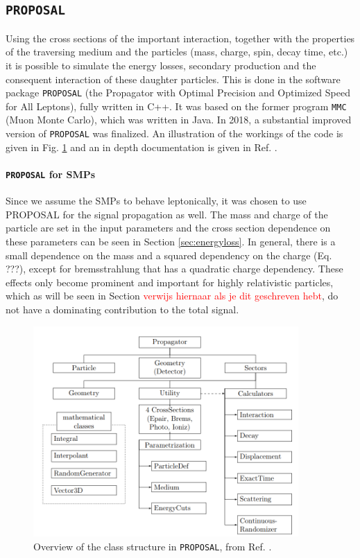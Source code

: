 \subsection{\texttt{PROPOSAL}}
Using the cross sections of the important interaction, together with the properties of the traversing medium and the particles (mass, charge, spin, decay time, etc.) it is possible to simulate the energy losses, secondary production and the consequent interaction of these daughter particles. This is done in the software package \texttt{PROPOSAL}  (the Propagator with Optimal Precision and Optimized Speed for All Leptons), fully written in C++. It was based on the former program \texttt{MMC} (Muon Monte Carlo), which was written in Java. In 2018, a substantial improved version of \texttt{PROPOSAL} was finalized. An illustration of the workings of the code is given in Fig. \ref{fig:proposal} and an in depth documentation is given in Ref. \cite{Dunsch:2018nsc}.

\paragraph{\texttt{PROPOSAL} for SMPs}
Since we assume the SMPs to behave leptonically, it was chosen to use PROPOSAL for the signal propagation as well. The mass and charge of the particle are set in the input parameters and the cross section dependence on these parameters can be seen in Section \ref{sec:energyloss}. In general, there is a small dependence on the mass and a squared dependency on the charge (Eq. ???), except for bremsstrahlung that has a quadratic charge dependency. These effects only become prominent and important for highly relativistic particles, which as will be seen in Section \textcolor{red}{verwijs hiernaar als je dit geschreven hebt}, do not have a dominating contribution to the total signal.\\

\begin{figure}
\centering
\includegraphics[width=0.9\textwidth]{chapter6/img/proposal.png}
\caption{Overview of the class structure in \texttt{PROPOSAL}, from Ref. \cite{Dunsch:2018nsc}.}
\label{fig:proposal}
\end{figure}

